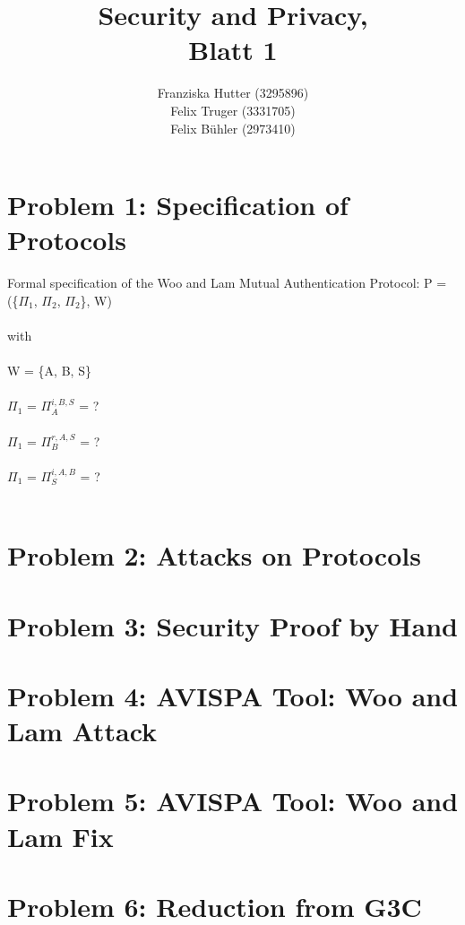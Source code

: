 \documentclass[12pt,pdftex,a4paper]{article}
\title{Security and Privacy,\\ Blatt 1}
\author{Franziska Hutter (3295896)\\
	Felix Truger (3331705)\\
	Felix Bühler (2973410)}
\begin{document}
\maketitle
\pagebreak

\section*{Problem 1: Specification of Protocols}
Formal specification of the Woo and Lam Mutual Authentication Protocol:
\linebreak\linebreak
P = (\{$\Pi_1$, $\Pi_2$, $\Pi_2$\}, W)\\~\\
with\\~\\
W = \{A, B, S\}\\~\\
$\Pi_1$ = $\Pi_A^{i,B,S}$ = ? \\~\\
$\Pi_1$ = $\Pi_B^{r,A,S}$ = ? \\~\\
$\Pi_1$ = $\Pi_S^{i,A,B}$ = ? \\~\\

\section*{Problem 2: Attacks on Protocols}

\section*{Problem 3: Security Proof by Hand}

\section*{Problem 4: AVISPA Tool: Woo and Lam Attack}

\section*{Problem 5: AVISPA Tool: Woo and Lam Fix}

\section*{Problem 6: Reduction from G3C}
\end{document}
